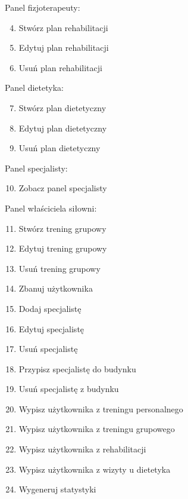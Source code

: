 \documentclass[
]{article}
\providecommand{\tightlist}{%
  \setlength{\itemsep}{0pt}\setlength{\parskip}{0pt}}
\begin{document}
{Panel fizjoterapeuty:}

\begin{enumerate}
\setcounter{enumi}{3}
\tightlist
\item
  {Stwórz plan rehabilitacji}
\item
  {Edytuj plan rehabilitacji}
\item
  {Usuń plan rehabilitacji}
\end{enumerate}

{Panel dietetyka:}

\begin{enumerate}
\setcounter{enumi}{6}
\tightlist
\item
  {Stwórz plan dietetyczny}
\item
  {Edytuj plan dietetyczny}
\item
  {Usuń plan dietetyczny}
\end{enumerate}

{Panel specjalisty:}

\begin{enumerate}
\setcounter{enumi}{9}
\tightlist
\item
  {Zobacz panel specjalisty}
\end{enumerate}

{Panel właściciela siłowni:}

\begin{enumerate}
\setcounter{enumi}{10}
\tightlist
\item
  {Stwórz trening grupowy}
\item
  {Edytuj trening grupowy}
\item
  {Usuń trening grupowy}
\item
  {Zbanuj użytkownika}
\item
  {Dodaj specjalistę}
\item
  {Edytuj specjalistę}
\item
  {Usuń specjalistę}
\item
  {Przypisz specjalistę do budynku}
\item
  {Usuń specjalistę z budynku}
\item
  {Wypisz użytkownika z treningu personalnego}
\item
  {Wypisz użytkownika z treningu grupowego}
\item
  {Wypisz użytkownika z rehabilitacji}
\item
  {Wypisz użytkownika z wizyty u dietetyka}
\item
  {Wygeneruj statystyki}
\end{enumerate}
\end{document}
